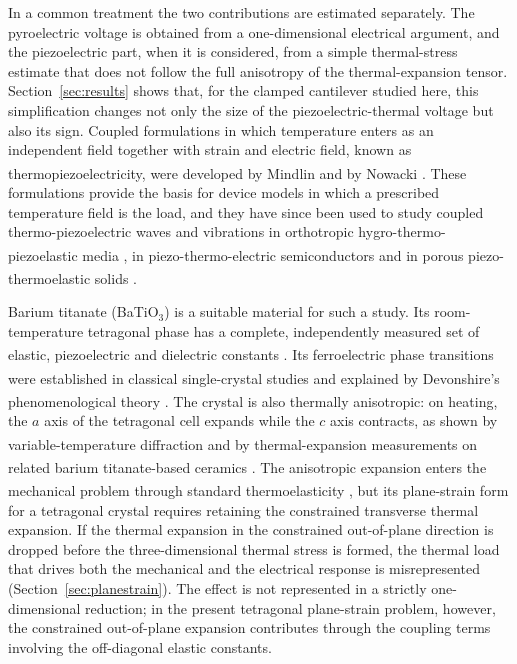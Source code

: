 \documentclass[a4paper, 11pt, twoside]{article}
\newcommand{\supercite}[1]{\!\!\textsuperscript{\cite{#1}}}
\begin{document}
In a common treatment the two contributions are estimated separately. The pyroelectric
voltage is obtained from a one-dimensional electrical argument, and the piezoelectric
part, when it is considered, from a simple thermal-stress estimate that does not follow
the full anisotropy of the thermal-expansion tensor. Section~\ref{sec:results} shows
that, for the clamped cantilever studied here, this simplification changes not only the
size of the piezoelectric-thermal voltage but also its sign. Coupled formulations in
which temperature enters as an independent field together with strain and electric
field, known as thermopiezoelectricity, were developed by Mindlin and by Nowacki
\supercite{Mindlin1972,Nowacki1975}. These formulations provide the basis for device models
in which a prescribed temperature field is the load, and they have since been used to
study coupled thermo-piezoelectric waves and vibrations in orthotropic
hygro-thermo-piezoelastic media \supercite{Gupta2024JNMP}, in piezo-thermo-electric
semiconductors \supercite{Gupta2024WRCM,Gupta2025HFF} and in porous piezo-thermoelastic
solids \supercite{Das2026KG}.

Barium titanate (BaTiO$_3$) is a suitable material for such a study. Its
room-temperature tetragonal phase has a complete, independently measured set of
elastic, piezoelectric and dielectric constants \supercite{Zgonik1994,Berlincourt1958}. Its
ferroelectric phase transitions were established in classical single-crystal studies
\supercite{Merz1949,KayVousden1949} and explained by Devonshire's phenomenological theory
\supercite{Devonshire1949,Devonshire1951}. The crystal is also thermally anisotropic: on
heating, the $a$ axis of the tetragonal cell expands while the $c$ axis contracts, as
shown by variable-temperature diffraction \supercite{Nakatani2016} and by thermal-expansion
measurements on related barium titanate-based ceramics \supercite{Han2015,He2015Thermal}.
The anisotropic expansion enters the mechanical problem through standard
thermoelasticity \supercite{BoleyWeiner1997,Nowacki1975}, but its plane-strain form for a
tetragonal crystal requires retaining the constrained transverse thermal expansion.
If the thermal expansion in the constrained out-of-plane direction is dropped before
the three-dimensional thermal stress is formed, the thermal load that drives both the
mechanical and the electrical response is misrepresented (Section~\ref{sec:planestrain}).
The effect is not represented in a strictly one-dimensional reduction; in the present
tetragonal plane-strain problem, however, the constrained out-of-plane expansion
contributes through the coupling terms involving the off-diagonal elastic constants.
\end{document}
